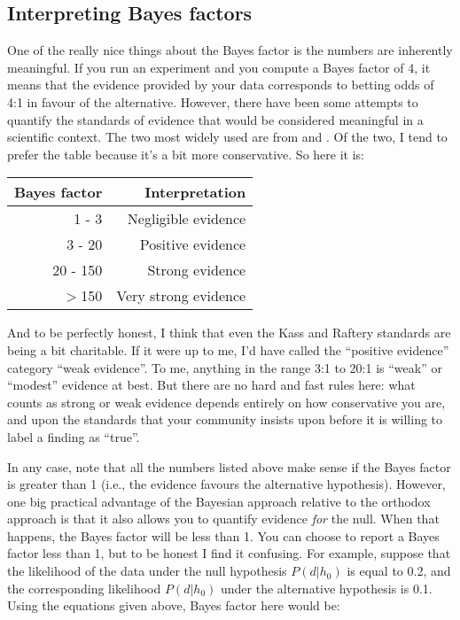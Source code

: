 \subsection{Interpreting Bayes factors}

One of the really nice things about the Bayes factor is the numbers are inherently meaningful. If you run an experiment and you compute a Bayes factor of 4, it means that the evidence provided by your data corresponds to betting odds of 4:1 in favour of the alternative. However, there have been some attempts to quantify the standards of evidence that would be considered meaningful in a scientific context. The two most widely used are from  and . Of the two, I tend to prefer the  table because it's a bit more conservative. So here it is:

\begin{center}
\begin{tabular}{r|r}
Bayes factor & Interpretation \\ \hline
1 - 3 & Negligible evidence \\
3 - 20 & Positive evidence \\
20 - 150 & Strong evidence \\
$>$150 & Very strong evidence
\end{tabular}
\end{center} 

\noindent
And to be perfectly honest, I think that even the Kass and Raftery standards are being a bit charitable. If it were up to me, I'd have called the ``positive evidence'' category ``weak evidence''. To me, anything in the range 3:1 to 20:1 is ``weak'' or ``modest'' evidence at best. But there are no hard and fast rules here: what counts as strong or weak evidence depends entirely on how conservative you are, and upon the standards that your community insists upon before it is willing to label a finding as ``true''. 

In any case, note that all the numbers listed above make sense if the Bayes factor is greater than 1 (i.e., the evidence favours the alternative hypothesis). However, one big practical advantage of the Bayesian approach relative to the orthodox approach is that it also allows you to quantify evidence {\it for} the null. When that happens, the Bayes factor will be less than 1. You can choose to report a Bayes factor less than 1, but to be honest I find it confusing. For example, suppose that the likelihood of the data under the null hypothesis $P(d|h_0)$ is equal to 0.2, and the corresponding likelihood $P(d|h_0)$ under the alternative hypothesis is 0.1. Using the equations given above,  Bayes factor here would be:

